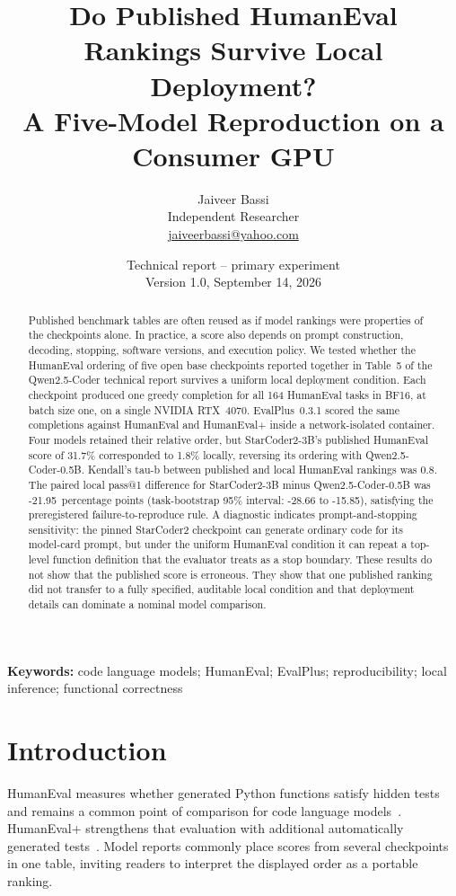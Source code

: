 \documentclass[10pt,twocolumn]{article}
\title{\vspace{-1.5em}\textbf{Do Published HumanEval Rankings Survive Local Deployment?}\\
\large A Five-Model Reproduction on a Consumer GPU}
\author{Jaiveer Bassi\\
\small Independent Researcher\\
\small \href{mailto:jaiveerbassi@yahoo.com}{jaiveerbassi@yahoo.com}}
\date{\small Technical report -- primary experiment\\Version 1.0, September 14, 2026}
\newcommand{\pp}{percentage points}
\begin{document}
\maketitle
\thispagestyle{fancy}

\begin{abstract}
Published benchmark tables are often reused as if model rankings were properties of the checkpoints alone. In practice, a score also depends on prompt construction, decoding, stopping, software versions, and execution policy. We tested whether the HumanEval ordering of five open base checkpoints reported together in Table~5 of the Qwen2.5-Coder technical report survives a uniform local deployment condition. Each checkpoint produced one greedy completion for all 164 HumanEval tasks in BF16, at batch size one, on a single NVIDIA RTX~4070. EvalPlus~0.3.1 scored the same completions against HumanEval and HumanEval+ inside a network-isolated container. Four models retained their relative order, but StarCoder2-3B's published HumanEval score of 31.7\% corresponded to 1.8\% locally, reversing its ordering with Qwen2.5-Coder-0.5B. Kendall's tau-b between published and local HumanEval rankings was 0.8. The paired local pass@1 difference for StarCoder2-3B minus Qwen2.5-Coder-0.5B was -21.95~\pp{} (task-bootstrap 95\% interval: -28.66 to -15.85), satisfying the preregistered failure-to-reproduce rule. A diagnostic indicates prompt-and-stopping sensitivity: the pinned StarCoder2 checkpoint can generate ordinary code for its model-card prompt, but under the uniform HumanEval condition it can repeat a top-level function definition that the evaluator treats as a stop boundary. These results do not show that the published score is erroneous. They show that one published ranking did not transfer to a fully specified, auditable local condition and that deployment details can dominate a nominal model comparison.
\end{abstract}

\noindent\textbf{Keywords:} code language models; HumanEval; EvalPlus; reproducibility; local inference; functional correctness

\section{Introduction}

HumanEval measures whether generated Python functions satisfy hidden tests and remains a common point of comparison for code language models~\citep{chen2021humaneval}. HumanEval+ strengthens that evaluation with additional automatically generated tests~\citep{liu2023evalplus}. Model reports commonly place scores from several checkpoints in one table, inviting readers to interpret the displayed order as a portable ranking.
\end{document}
